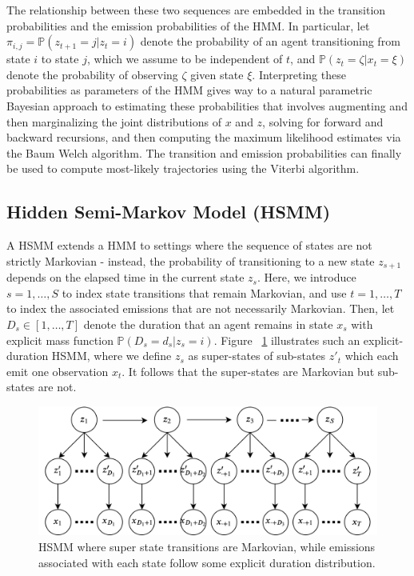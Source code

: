 \documentclass{article}
\begin{document}
The relationship between these two sequences are embedded in the transition probabilities and the emission probabilities of the HMM. In particular, let $\pi_{i,j} = \mathbb{P}(z_{t+1} = j | z_{t} = i)$ denote the probability of an agent transitioning from state $i$ to state $j$, which we assume to be independent of $t$, and $\mathbb{P}(z_t = \zeta | x_t = \xi)$ denote the probability of observing $\zeta$ given state $\xi$. Interpreting these probabilities as parameters of the HMM gives way to a natural parametric Bayesian approach to estimating these probabilities that involves augmenting and then marginalizing the joint distributions of $x$ and $z$, solving for forward and backward recursions, and then computing the maximum likelihood estimates via the Baum Welch algorithm. The transition and emission probabilities can finally be used to compute most-likely trajectories using the Viterbi algorithm.

\subsection{Hidden Semi-Markov Model (HSMM)}
A HSMM extends a HMM to settings where the sequence of states are not strictly Markovian - instead, the probability of transitioning to a new state $z_{s+1}$ depends on the elapsed time in the current state $z_s$. Here, we introduce $s = 1, \dots, S$ to index state transitions that remain Markovian, and use $t= 1, \dots, T$ to index the associated emissions that are not necessarily Markovian. Then, let $D_s \in [1, \dots, T]$ denote the duration that an agent remains in state $x_s$ with explicit mass function $\mathbb{P}(D_s = d_s | z_s = i)$. Figure ~\ref{fig:hsmm} illustrates such an explicit-duration HSMM, where we define $z_s$ as super-states of sub-states $z'_{t}$ which each emit one observation $x_{t}$. It follows that the super-states are Markovian but sub-states are not.

\begin{figure}[H]
\centering
\includegraphics[scale=0.15]{images/hsmm2.png}
\caption{HSMM where super state transitions are Markovian, while emissions associated with each state follow some explicit duration distribution.}
\label{fig:hsmm}
\end{figure}
\end{document}
